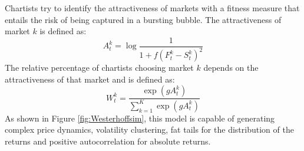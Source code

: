 \documentclass[runningheads]{llncs}
\begin{document}
Chartists try to identify the attractiveness of markets with a fitness measure that entails the risk of being captured in a bursting bubble. The attractiveness of market $k$ is defined as:
\begin{equation*}
A^k_t = \log \frac{1}{1+f(F_t^k - S^k_t)^2}
\end{equation*}
The relative percentage of chartists choosing market $k$ depends on the attractiveness of that market and is defined as:
\begin{equation*}
W^k_t = \frac{\exp(gA^k_t)}{\sum_{k=1}^K \exp(gA^k_t)}
\end{equation*}
As shown in Figure \ref{fig:Westerhoffsim}, this model is capable of  generating complex price dynamics, volatility clustering, fat tails for the distribution of the returns and positive autocorrelation for absolute returns.
\begin{figure}[htbp]
  \begin{center}
   \mbox{
      \quad
       \quad
}
\end{center}
\end{figure}
\end{document}
